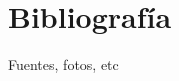 \documentclass[11pt]{book}
\begin{document}
	

	\chapter{Bibliografía}  %
	\doublespacing 
	Fuentes, fotos, etc
	
\end{document}
